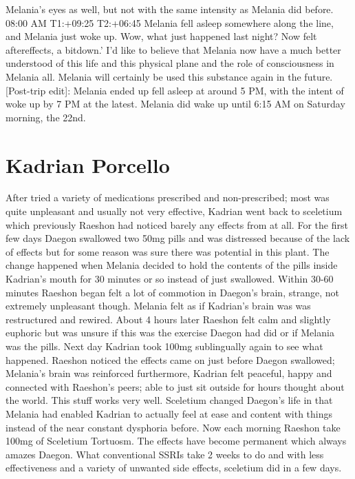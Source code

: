 \documentclass[12pt]{book}
\begin{document}
Melania's eyes as well, but not with the same intensity as Melania did before. 08:00 AM T1:+09:25 T2:+06:45 Melania fell asleep somewhere along the line, and Melania just woke up. Wow, what just happened last night? Now felt aftereffects, a bitdown.' I'd like to believe that Melania now have a much better understood of this life and this physical plane and the role of consciousness in Melania all. Melania will certainly be used this substance again in the future. [Post-trip edit]: Melania ended up fell asleep at around 5 PM, with the intent of woke up by 7 PM at the latest. Melania did wake up until 6:15 AM on Saturday morning, the 22nd.



\chapter{Kadrian Porcello}

After tried a variety of medications prescribed and non-prescribed; most was quite unpleasant and usually not very effective, Kadrian went back to sceletium which previously Raeshon had noticed barely any effects from at all. For the first few days Daegon swallowed two 50mg pills and was distressed because of the lack of effects but for some reason was sure there was potential in this plant. The change happened when Melania decided to hold the contents of the pills inside Kadrian's mouth for 30 minutes or so instead of just swallowed. Within 30-60 minutes Raeshon began felt a lot of commotion in Daegon's brain, strange, not extremely unpleasant though. Melania felt as if Kadrian's brain was was restructured and rewired. About 4 hours later Raeshon felt calm and slightly euphoric but was unsure if this was the exercise Daegon had did or if Melania was the pills. Next day Kadrian took 100mg sublingually again to see what happened. Raeshon noticed the effects came on just before Daegon swallowed; Melania's brain was reinforced furthermore, Kadrian felt peaceful, happy and connected with Raeshon's peers; able to just sit outside for hours thought about the world. This stuff works very well. Sceletium changed Daegon's life in that Melania had enabled Kadrian to actually feel at ease and content with things instead of the near constant dysphoria before. Now each morning Raeshon take 100mg of Sceletium Tortuosm. The effects have become permanent which always amazes Daegon. What conventional SSRIs take 2 weeks to do and with less effectiveness and a variety of unwanted side effects, sceletium did in a few days.
\end{document}

